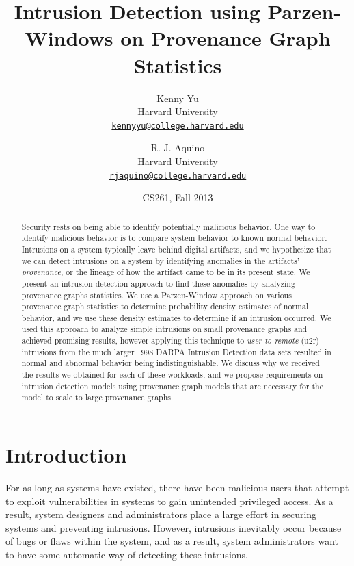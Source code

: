 \documentclass[10pt,twocolumn]{article}
\title{{\bf Intrusion Detection using Parzen-Windows on Provenance Graph Statistics}}
\author{
    Kenny Yu\\
    Harvard University\\
    \href{mailto:kennyyu@college.harvard.edu}{\texttt{kennyyu@college.harvard.edu}}
  \and
    R. J. Aquino\\
    Harvard University\\
    \href{mailto:rjaquino@college.harvard.edu}{\texttt{rjaquino@college.harvard.edu}}
}
\date{CS261, Fall 2013}
\begin{document}
\maketitle

%

\begin{abstract}
Security rests on being able to identify potentially malicious behavior.
One way to identify malicious behavior is to compare system behavior to known normal behavior.
Intrusions on a system typically leave behind digital artifacts, and we hypothesize
that we can detect intrusions on a system by identifying anomalies in the artifacts' {\em provenance}, or the lineage of how
the artifact came to be in its present state.
We present an intrusion detection approach to find these anomalies by analyzing provenance graphs statistics. We use a Parzen-Window approach \cite{parzen} on various provenance graph statistics \cite{clustering}
to determine probability density estimates of normal behavior, and we use these density estimates to 
determine if an intrusion occurred. We used this approach to analyze simple intrusions on small provenance graphs and achieved promising results, however applying this technique to {\em user-to-remote} (u2r) intrusions 
from the much larger 1998 DARPA Intrusion Detection data sets  \cite{darpa} resulted in normal and abnormal behavior being indistinguishable. We discuss why we received the results we obtained for each of these workloads, and we propose requirements on intrusion detection models using provenance graph models that are necessary for the model to scale to large provenance graphs.

\end{abstract}

%

\section{Introduction}

For as long as systems have existed, there have been malicious users that attempt to exploit vulnerabilities
in systems to gain unintended privileged access. As a result, system designers and 
administrators place a large effort in securing systems and preventing intrusions. However, intrusions
inevitably occur because of bugs or flaws within the system, and as a result, system administrators want to
have some automatic way of detecting these intrusions. 
\end{document}
